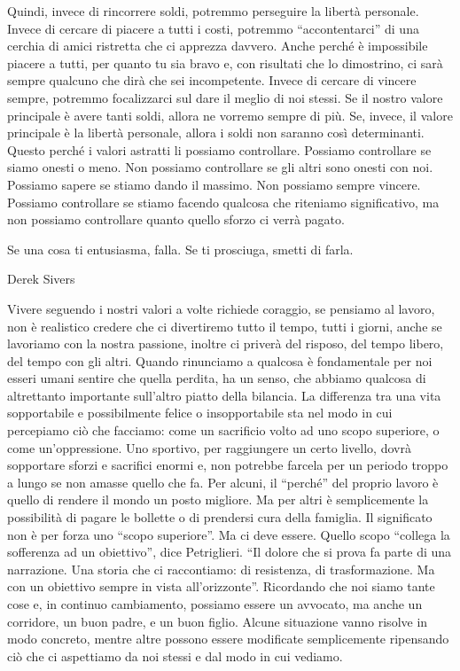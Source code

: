 \documentclass[12pt]{book} %
\begin{document}
Quindi, invece di rincorrere soldi, potremmo perseguire la libertà personale. Invece di cercare di piacere a tutti i
costi, potremmo “accontentarci” di una cerchia di amici ristretta che ci apprezza davvero. Anche perché è impossibile
piacere a tutti, per quanto tu sia bravo e, con risultati che lo dimostrino, ci sarà sempre qualcuno che dirà che sei
incompetente. Invece di cercare di vincere sempre, potremmo focalizzarci sul dare il meglio di noi stessi. Se il nostro
valore principale è avere tanti soldi, allora ne vorremo sempre di più. Se, invece, il valore principale è la libertà
personale, allora i soldi non saranno così determinanti. Questo perché i valori astratti li possiamo controllare.
Possiamo controllare se siamo onesti o meno. Non possiamo controllare se gli altri sono onesti con noi. Possiamo sapere
se stiamo dando il massimo. Non possiamo sempre vincere. Possiamo controllare se stiamo facendo qualcosa che riteniamo
significativo, ma non possiamo controllare quanto quello sforzo ci verrà pagato.


\bigskip

Se una cosa ti entusiasma, falla. Se ti prosciuga, smetti di farla.

Derek Sivers


\bigskip

Vivere seguendo i nostri valori a volte richiede coraggio, se pensiamo al lavoro, non è realistico credere che ci
divertiremo tutto il tempo, tutti i giorni, anche se lavoriamo con la nostra passione, inoltre ci priverà del risposo, 
del tempo libero, del tempo con gli altri.
Quando rinunciamo a qualcosa è fondamentale per noi esseri umani sentire che quella perdita, ha un senso, che abbiamo
qualcosa di altrettanto importante sull'altro piatto della bilancia. La differenza tra una vita
sopportabile e possibilmente felice o insopportabile sta nel modo in cui percepiamo ciò che facciamo: come un
sacrificio volto ad uno scopo superiore, o come un'oppressione. Uno sportivo, per raggiungere un
certo livello, dovrà sopportare sforzi e sacrifici enormi e, non potrebbe farcela per un periodo troppo a lungo se non
amasse quello che fa. Per alcuni, il “perché” del proprio lavoro è quello di rendere il mondo un posto migliore. Ma per
altri è semplicemente la possibilità di pagare le bollette o di prendersi cura della famiglia. Il significato non è per
forza uno “scopo superiore”. Ma ci deve essere. Quello scopo “collega la sofferenza ad un obiettivo”, dice Petriglieri.
“Il dolore che si prova fa parte di una narrazione. Una storia che ci raccontiamo: di resistenza, di trasformazione. Ma
con un obiettivo sempre in vista all'orizzonte”. Ricordando che noi siamo tante cose e, in
continuo cambiamento, possiamo essere un avvocato, ma anche un corridore, un buon padre, e un buon figlio. Alcune
situazione vanno risolve in modo concreto, mentre altre possono essere modificate semplicemente ripensando ciò che ci
aspettiamo da noi stessi e dal modo in cui vediamo.
\end{document}
